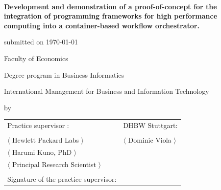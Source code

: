 \begin{spacing}{1}
\begin{center}	
~\vspace{0mm}

{\sffamily
\large  
\textbf{
    Development and demonstration of a proof-of-concept for the integration of programming frameworks for high performance computing into a container-based workflow orchestrator.
    }
\bigskip
\textbf{}
}


\vspace{15mm}

{\Large \typMeinerArbeit}

\vspace{1cm}

submitted on \today 

\vspace{15mm}

Faculty of Economics
\medskip

Degree program in Business Informatics

\medskip

International Management for Business and Information Technology 

\vspace{10mm}

by

\vspace{10mm}
    
{\large\textsc{\meinName}}

\vspace{10mm}
\end{center}

\vfill

\begin{tabular}{ll}
Practice supervisor : & DHBW Stuttgart: \\
\hspace{0.4\linewidth} & \\
$\langle$ Hewlett Packard Labs $\rangle$ & $\langle$ Dominic Viola $\rangle$ \\
$\langle$ Harumi Kuno, PhD $\rangle$ 
&  \\
$\langle$ Principal Research Scientist $\rangle$ \\
\\
Signature of the practice supervisor: \\
\end{tabular}


\vspace{1cm}
\end{spacing}

